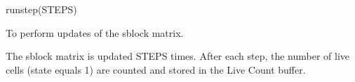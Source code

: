 

\format

runstep(STEPS)

\purpose

To perform updates of the sblock matrix.

\description

The sblock matrix is updated STEPS times.
After each step, the number of live cells (state equals 1) are counted and stored in the Live Count buffer.
